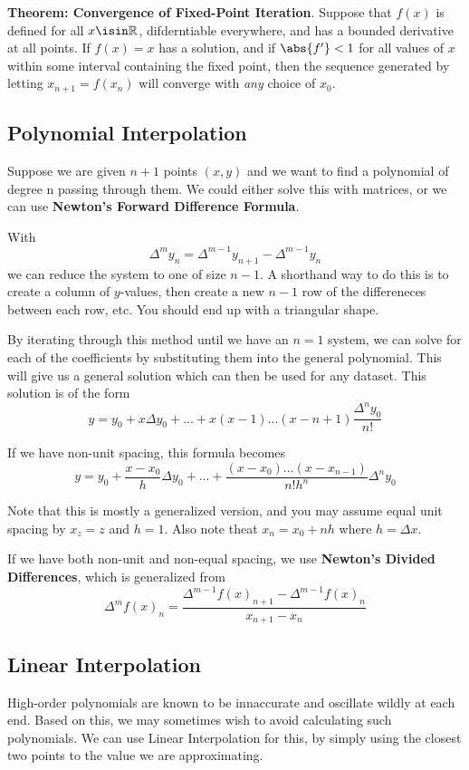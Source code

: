 \documentclass[12pt]{article}
\begin{document}
{\bf Theorem: Convergence of Fixed-Point Iteration}. Suppose that $f(x)$ is defined for all $x \isin \mathbb{R}$, difderntiable everywhere, and has a bounded derivative at all points. If $f(x) = x$ has a solution, and if $\abs{f^\prime} < 1$ for all values of $x$ within some interval containing the fixed point, then the sequence generated by letting $x_{n+1} = f(x_n)$ will converge with \emph{any} choice of $x_0$.

\subsection*{Polynomial Interpolation}
Suppose we are given $n+1$ points $(x,y)$ and we want to find a polynomial of degree n passing through them. We could either solve this with matrices, or we can use {\bf Newton's Forward Difference Formula}.

With \[ \Delta^m y_n = \Delta^{m-1} y_{n+1} - \Delta^{m-1} y_n \] we can reduce the system to one of size $n-1$. A shorthand way to do this is to create a column of $y$-values, then create a new $n-1$ row of the differeneces between each row, etc. You should end up with a triangular shape.

By iterating through this method until we have an $n = 1$ system, we can solve for each of the coefficients by substituting them into the general polynomial. This will give us a general solution which can then be used for any dataset. This solution is of the form \[ y = y_0 + x\Delta y_0 + ... + x(x - 1)...(x - n + 1)\frac{\Delta^ny_0}{n!} \]

If we have non-unit spacing, this formula becomes \[ y = y_0 + \frac{x - x_0}{h}\Delta y_0 + ... + \frac{(x - x_0)...(x - x_{n-1})}{n!h^n}\Delta^n y_0 \]

Note that this is mostly a generalized version, and you may assume equal unit spacing by $x_z = z$ and $h = 1$. Also note theat $x_n = x_0 + nh$ where $h = \Delta x$.

If we have both non-unit and non-equal spacing, we use {\bf Newton's Divided Differences}, which is generalized from \[ \Delta^m f(x)_n = \frac{\Delta^{m-1} f(x)_{n+1} - \Delta^{m-1} f(x)_n}{x_{n+1} - x_n} \]

\subsection*{Linear Interpolation}
High-order polynomials are known to be innaccurate and oscillate wildly at each end. Based on this, we may sometimes wish to avoid calculating such polynomials. We can use Linear Interpolation for this, by simply using the closest two points to the value we are approximating.
\end{document}

